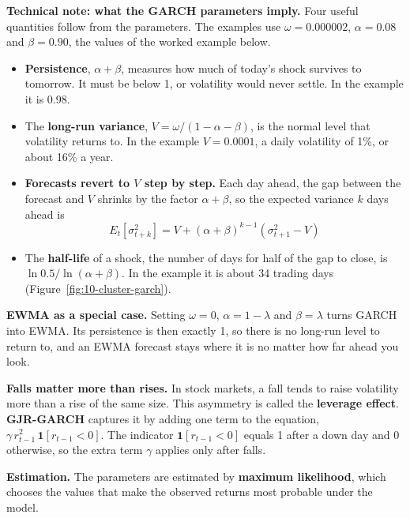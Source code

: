 \begin{technote}
\textbf{Technical note: what the GARCH parameters imply.} Four useful quantities follow from the parameters. The examples use $\omega = 0.000002$, $\alpha = 0.08$ and $\beta = 0.90$, the values of the worked example below.
\begin{itemize}
  \item \textbf{Persistence}, $\alpha + \beta$, measures how much of today's shock survives to tomorrow. It must be below 1, or volatility would never settle. In the example it is 0.98.
  \item The \textbf{long-run variance}, $V = \omega / (1 - \alpha - \beta)$, is the normal level that volatility returns to. In the example $V = 0.0001$, a daily volatility of 1\%, or about 16\% a year.
  \item \textbf{Forecasts revert to $V$ step by step.} Each day ahead, the gap between the forecast and $V$ shrinks by the factor $\alpha + \beta$, so the expected variance $k$ days ahead is
  \begin{equation}
    E_t[\sigma^2_{t+k}] = V + (\alpha + \beta)^{k-1}\left(\sigma^2_{t+1} - V\right)
    \label{eq:10-forecast}
  \end{equation}
  \item The \textbf{half-life} of a shock, the number of days for half of the gap to close, is $\ln 0.5 / \ln(\alpha + \beta)$. In the example it is about 34 trading days (Figure~\ref{fig:10-cluster-garch}).
\end{itemize}

\textbf{EWMA as a special case.} Setting $\omega = 0$, $\alpha = 1 - \lambda$ and $\beta = \lambda$ turns GARCH into EWMA. Its persistence is then exactly 1, so there is no long-run level to return to, and an EWMA forecast stays where it is no matter how far ahead you look.
\end{technote}

\textbf{Falls matter more than rises.} In stock markets, a fall tends to raise volatility more than a rise of the same size. This asymmetry is called the \textbf{leverage effect}. \textbf{GJR-GARCH} captures it by adding one term to the equation, $\gamma\,r^2_{t-1}\,\mathbf{1}[r_{t-1} < 0]$. The indicator $\mathbf{1}[r_{t-1} < 0]$ equals 1 after a down day and 0 otherwise, so the extra term $\gamma$ applies only after falls.

\textbf{Estimation.} The parameters are estimated by \textbf{maximum likelihood}, which chooses the values that make the observed returns most probable under the model.


